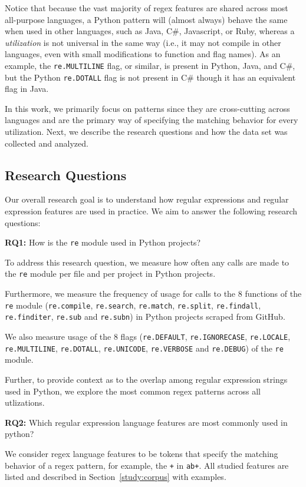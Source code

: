 Notice that because the vast majority of regex features are shared across most all-purpose languages, a Python {pattern} will (almost always) behave the same when used in other languages, such as Java, C\#, Javascript, or Ruby, whereas a \emph{utilization} is not universal in the same way (i.e., it may not compile in other languages, even with small modifications to function and flag names). As an example, the {\tt re.MULTILINE} flag, or similar, is present in Python, Java, and C\#, but  the Python {\tt re.DOTALL} flag is not present in C\# though it has an equivalent flag in Java.  

In this work, we primarily focus on patterns since they are cross-cutting across languages and are the primary way of specifying the matching behavior for every utilization. Next, we describe the research questions and how the data set was collected and analyzed.

\subsection{Research Questions}
Our overall research goal is to understand how regular expressions and regular expression features are used in practice. We aim to answer the following research questions:

\textbf{RQ1:} How  is the {\tt re} module used in Python projects?

To address this research question, we measure how often any calls are made to the {\tt re} module per file and per project in Python projects.

Furthermore, we measure the frequency of usage for calls to the 8 functions of the {\tt re} module ({\tt re.compile}, {\tt re.search}, {\tt re.match}, {\tt re.split}, {\tt re.findall}, {\tt re.finditer}, {\tt re.sub} and {\tt re.subn}) in Python projects scraped from GitHub.

We also measure usage of the 8 flags ({\tt re.DEFAULT}, {\tt re.IGNORECASE}, {\tt re.LOCALE}, {\tt re.MULTILINE}, {\tt re.DOTALL}, {\tt re.UNICODE}, {\tt re.VERBOSE} and {\tt re.DEBUG}) of the {\tt re} module.

Further, to provide context as to the overlap among regular expression strings used in Python, we explore the most common regex {patterns} across all utlizations.

\textbf{RQ2:} Which regular expression language features are most commonly used in python?

We consider regex language features to be tokens that specify the matching behavior of a regex pattern, for example,  the {\tt +} in {\tt ab+}.  All studied features are listed and described in Section~\ref{study:corpus} with examples.

